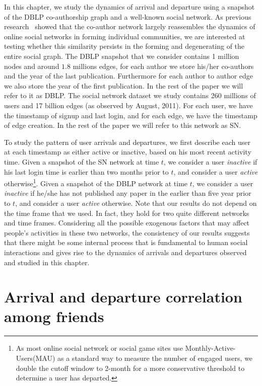 \documentclass[phd,tocprelim]{cornell}
\begin{document}
In this chapter, we study the dynamics of arrival and departure using a
snapshot of the DBLP co-authorship graph and a well-known social
network. As previous research~\cite{Backstrom:2006} showed that the co-author network largely reassembles the dynamics of online social networks in forming individual communities, we are interested at 
testing whether this similarity persists in the forming and degenerating of the entire social graph. The DBLP snapshot that we consider contains 1 million nodes
and around $1.8$ millions edges, for each author we store his/her co-authors and the year of the last publication. Furthermore for each author to author
edge we also store the year of the first publication. In the rest of
the paper we will refer to it as DBLP. 
The social network dataset we study contains 260 millions of users and 17 billion edges (as observed by August, 2011).  For each
user, we have the timestamp of signup and last login, and for each
edge, we have the timestamp of edge creation. In the rest of the paper
we will refer to this network as SN.

To study the pattern of user arrivals and departures, we first
describe each user at each timestamp as either active or inactive,
based on his most recent activity time. Given a snapshot of the SN network
at time $t$, we consider a user \emph{inactive} if his last login time
is earlier than two months prior to $t$, and consider a user
\emph{active} otherwise\footnote{As most online social network or social game sites use Monthly-Active-Users(MAU) as a standard way to measure the number of engaged users, we double the cutoff window to 2-month for a more conservative threshold to determine a user has departed.}. Given a snapshot of the DBLP network
at time $t$, we consider a user \emph{inactive} if he/she has not published any 
paper in the earlier than five year prior to $t$, and consider a user
\emph{active} otherwise. Note that our results do not depend on the time frame that we used. In fact, they hold for two quite different networks and time frames. Considering all the possible exogenous factors that may affect people's activities in these two networks, the consistency of our results suggests that there might be some internal process that is fundamental to human social interactions and gives rise to the dynamics of arrivals and departures observed and studied in this chapter.




\section{Arrival and departure correlation among friends}
\end{document}
